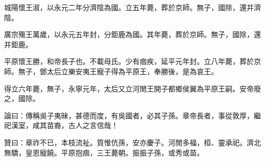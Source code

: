 \begin{pinyinscope}
城陽懷王淑，以永元二年分濟陰為國。立五年薨，葬於京師。無子，國除，還并濟陰。

廣宗殤王萬歲，以永元五年封，分鉅鹿為國。其年薨，葬於京師。無子，國除，還并鉅鹿。

平原懷王勝，和帝長子也。不載母氏。少有痼疾，延平元年封。立八年薨，葬於京師。無子，鄧太后立樂安夷王寵子得為平原王，奉勝後，是為哀王。

得立六年薨，無子，永寧元年，太后又立河閒王開子都鄉侯翼為平原王嗣。安帝廢之，國除。

論曰：傳稱吳子夷昧，甚德而度，有吳國者，必其子孫。章帝長者，事從敦厚，繼祀漢室，咸其苗裔，古人之言信哉！

贊曰：章祚不已，本枝流祉。質惟伉孫，安亦慶子。河閒多福，桓、靈承祀。濟北無驕，皇恩寵饒。平原抱痼，三王薨朝。振振子孫，或秀或苗。


\end{pinyinscope}